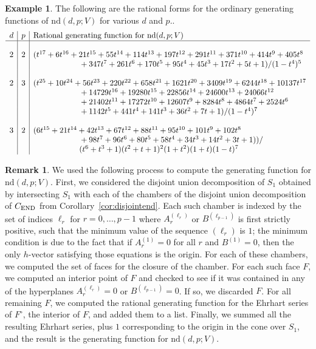 \documentclass[12pt]{amsart}
\theoremstyle{definition}
\newtheorem{example}[thm]{Example}
\newtheorem{remark}[thm]{Remark}
\numberwithin{equation}{section}
\renewcommand\>{\rangle}
\newcommand\<{\langle}
\newcommand\0{\mathbf{0}}
\newcommand{\CEND}{C_\textnormal{END}}
\newcommand\nd{\mathrm{nd}}
\begin{document}
\begin{example}
	The following are the rational forms for the ordinary generating functions of $\nd(d,p;V)$ for various $d$ and $p$..
	\[
	\begin{array}{c|c|l}
		d & p  & \text{Rational generating function for $\nd(d,p;V)$}\\	
		\hline & & \\
		2 & 2 & (t^{17} + 6t^{16} + 21t^{15} + 55t^{14} + 114t^{13} + 197t^{12} + 291t^{11} + 371t^{10} + 414t^9 + 405t^8 \\
		&  & \phantom{aaaaaaaaaaa} + 347t^7 + 261t^6 + 170t^5 + 95t^4 + 45t^3 + 17t^2 + 5t + 1)/(1-t^4)^5  \\
		& & \\
		2 & 3 & (t^{25} + 10t^{24} + 56t^{23} + 220t^{22} + 658t^{21} + 1621t^{20} + 3409t^{19} + 6244t^{18} + 10137t^{17} \\
		&  & \phantom{aaaaaaaaaaa} + 14729t^{16} + 19280t^{15} + 22856t^{14} + 24600t^{13} + 24066t^{12} \\
		&  & \phantom{aaaaaaaaaaa} + 21402t^{11} + 17272t^{10} + 12607t^9 + 8284t^8 + 4864t^7 + 2524t^6 \\
		&  & \phantom{aaaaaaaaaaa} + 1142t^5 + 441t^4 + 141t^3 + 36t^2 + 7t + 1)/(1-t^4)^7 \\
		& & \\
		3 & 2 & (6t^{15} + 21t^{14} + 42t^{13} + 67t^{12} + 88t^{11} + 95t^{10} + 101t^9 + 102t^8\\
		&  & \phantom{aaaaaaaaaaa} + 98t^7 + 96t^6 + 80t^5 + 58t^4 + 34t^3 + 14t^2 + 3t + 1))/ \\
		&  & \phantom{aaaaaaaaaaa} (t^6 + t^3 + 1)(t^2 + t + 1)^2(1 + t^2)(1 + t)(1 -t )^7
	\end{array}
	\]
\end{example}

\begin{remark}
We used the following process to compute the generating function for $\nd(d,p;V)$.
First, we considered the disjoint union decomposition of $S_1$ obtained by intersecting $S_1$ with each of the chambers of the disjoint union decomposition of $\CEND$ from Corollary~\ref{cor:disjointend}.
Each such chamber is indexed by the set of indices $\ell_r$ for $r=0,\ldots,p-1$ where $A_r^{(\ell_r)}$ or $B^{(\ell_{p-1})}$ is first strictly positive, such that the minimum value of the sequence $(\ell_r)$ is $1$; the minimum condition is due to the fact that if $A_r^{(1)}=0$ for all $r$ and $B^{(1)}=0$, then the only $h$-vector satisfying those equations is the origin.
For each of these chambers, we computed the set of faces for the closure of the chamber.
For each such face $F$, we computed an interior point of $F$ and checked to see if it was contained in any of the hyperplanes $A_r^{(\ell_r)}=0$ or $B^{(\ell_{p-1})}=0$.
If so, we discarded $F$.
For all remaining $F$, we computed the rational generating function for the Ehrhart series of $F^\circ$, the interior of $F$, and added them to a list.
Finally, we summed all the resulting Ehrhart series, plus $1$ corresponding to the origin in the cone over $S_1$, and the result is the generating function for $\nd(d,p;V)$.
\end{remark}
\end{document}
